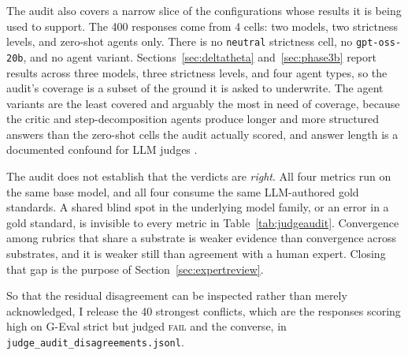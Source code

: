 The audit also covers a narrow slice of the configurations whose results
it is being used to support. The 400 responses come from 4 cells: two
models, two strictness levels, and zero-shot agents only. There is no
\texttt{neutral} strictness cell, no \texttt{gpt-oss-20b}, and no agent
variant. Sections~\ref{sec:deltatheta} and~\ref{sec:phase3b} report
results across three models, three strictness levels, and four agent
types, so the audit's coverage is a subset of the ground it is asked to
underwrite. The agent variants are the least covered and arguably the
most in need of coverage, because the critic and step-decomposition
agents produce longer and more structured answers than the zero-shot
cells the audit actually scored, and answer length is a documented
confound for LLM judges \citep{zheng2023judge}.

The audit does not establish that the verdicts are \emph{right}. All four
metrics run on the same base model, and all four consume the same
LLM-authored gold standards. A shared blind spot in the underlying model
family, or an error in a gold standard, is invisible to every metric in
Table~\ref{tab:judgeaudit}. Convergence among rubrics that share a
substrate is weaker evidence than convergence across substrates, and it
is weaker still than agreement with a human expert. Closing that gap is
the purpose of Section~\ref{sec:expertreview}.

So that the residual disagreement can be inspected rather than merely
acknowledged, I release the 40 strongest conflicts, which are the
responses scoring high on G-Eval strict but judged \textsc{fail} and the
converse, in \texttt{judge\_audit\_disagreements.jsonl}.
